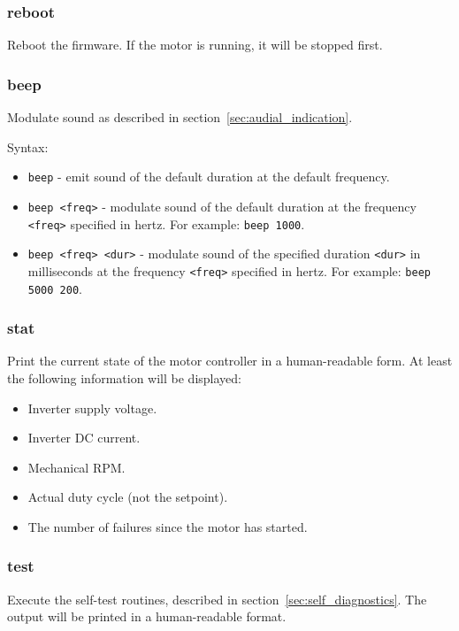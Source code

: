 \documentclass{zubaxdoc}
\begin{document}
\subsubsection{reboot}

Reboot the firmware.
If the motor is running, it will be stopped first.

\subsubsection{beep}

Modulate sound as described in section~\ref{sec:audial_indication}.

Syntax:
\begin{itemize}
\item \verb|beep| - emit sound of the default duration at the default frequency.
\item \verb|beep <freq>| - modulate sound of the default duration at the frequency \verb|<freq>|
specified in hertz. For example: \verb|beep 1000|.
\item \verb|beep <freq> <dur>| - modulate sound of the specified duration \verb|<dur>| in milliseconds
at the frequency \verb|<freq>| specified in hertz. For example: \verb|beep 5000 200|.
\end{itemize}

\subsubsection{stat}

Print the current state of the motor controller in a human-readable form.
At least the following information will be displayed:
\begin{itemize}
\item Inverter supply voltage.
\item Inverter DC current.
\item Mechanical RPM.
\item Actual duty cycle (not the setpoint).
\item The number of failures since the motor has started.
\end{itemize}

\subsubsection{test}

Execute the self-test routines, described in section~\ref{sec:self_diagnostics}.
The output will be printed in a human-readable format.
\end{document}

